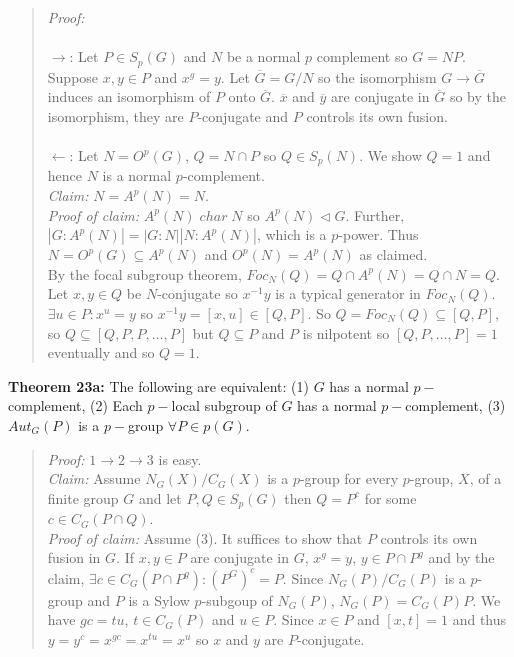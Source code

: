 \begin{quote}
\emph{Proof:}  
\\
\\
$\rightarrow$:  Let $P \in S_p(G)$ and $N$ be a normal $p$ complement so $G=NP$.
Suppose $x, y \in P$ and $x^g=y$.  Let ${\overline G}= G/N$ so the isomorphism
$G \rightarrow {\overline G}$ induces an isomorphism of $P$ onto ${\overline G}$.
${\overline x}$ and
${\overline y}$ are conjugate in 
${\overline G}$ so by the isomorphism, they are $P$-conjugate and $P$ controls its own
fusion.
\\
\\
$\leftarrow$:  Let $N= O^p(G)$, $Q= N \cap P$ so $Q \in S_p(N)$.  We show $Q=1$ and hence
$N$ is a normal $p$-complement.
\\
\emph{Claim:} $N= A^p(N)=N$.
\\
\emph{Proof of claim:}
$A^p(N) \; char \; N$ so $A^p(N) \lhd G$.  Further,
$|G:A^p(N)|= |G:N||N:A^p(N)|$, which is a $p$-power.  Thus
$N= O^p(G) \subseteq A^p(N)$ and $O^p(N)=A^p(N)$ as claimed.
\\
By the focal subgroup theorem,  $Foc_N(Q)= Q \cap A^p(N)= Q \cap N = Q$.  Let
$x, y \in Q$ be $N$-conjugate so $x^{-1}y$ is a typical generator in $Foc_N(Q)$.
$\exists u \in P: x^u=y$ so $x^{-1}y = [x,u] \in [Q, P]$.  So
$Q= Foc_N(Q) \subseteq [Q, P]$, so $Q \subseteq [Q, P, P, \ldots ,P]$ but
$Q \subseteq P$ and $P$ is nilpotent so $[Q, P, \ldots , P]= 1$ eventually and so
$Q= 1$.
\end{quote}
{\bf Theorem 23a:}  The following are equivalent:
(1) $G$ has a normal $p-$complement, 
(2) Each $p-$local subgroup of $G$ has a normal $p-$complement,
(3) $Aut_G(P)$ is a $p-$group $\forall P \in p(G)$.
\begin{quote}
\emph{Proof:}  
$1 \rightarrow 2 \rightarrow 3$ is easy.
\\
\emph{Claim:} Assume $N_G(X)/C_G(X)$ is a $p$-group for every $p$-group, $X$, of a finite
group $G$ and let $P, Q \in S_p(G)$ then $Q=P^c$ for some $c \in C_G(P \cap Q )$.
\\
\emph{Proof of claim:}
Assume (3).  It suffices to show that $P$ controls its own fusion in $G$.  If
$x,y \in P$ are conjugate in $G$, $x^g=y$, $y \in P \cap P^g$ and by the claim,
$\exists c \in C_G(P \cap P^g): (P^G)^c=P$.  Since $N_G(P)/C_G(P)$ is a $p$-group
and $P$ is a Sylow $p$-subgoup of $N_G(P)$,  $N_G(P)= C_G(P)P$.  We have
$gc=tu$, $t \in C_G(P)$ and $u \in P$.  Since $x \in P$ and $[x,t]=1$ and thus
$y=y^c=x^{gc}=x^{tu}=x^u$ so $x$ and $y$ are $P$-conjugate.
\end{quote}
